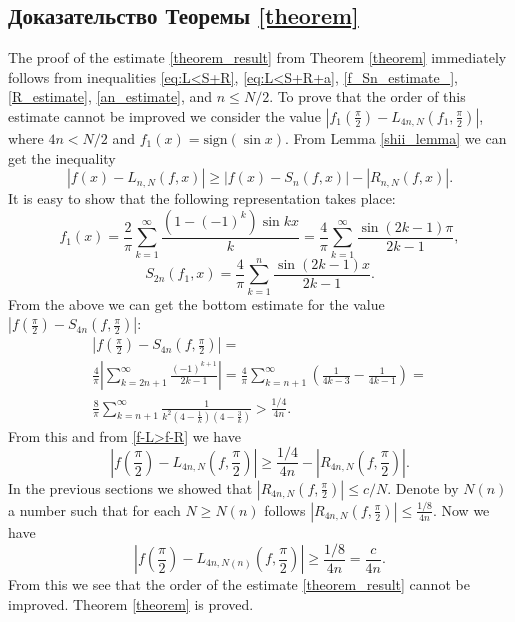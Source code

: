 \subsection{Доказательство Теоремы \ref{theorem}}
The proof of the estimate \eqref{theorem_result} from Theorem \ref{theorem} immediately follows from inequalities \eqref{eq:L<S+R}, \eqref{eq:L<S+R+a}, \eqref{f_Sn_estimate_}, \eqref{R_estimate}, \eqref{an_estimate},
and $n \leq N/2$.
To prove that the order of this estimate cannot be improved we consider the value $\left|f_1(\frac{\pi}{2}) - L_{4n,N}(f_1,\frac{\pi}{2})\right|$, where $4n < N/2$ and $f_1(x) = \mbox{sign} (\sin x)$.
From Lemma \ref{shii_lemma} we can get the inequality
\begin{equation*}
\left|f(x) - L_{n,N}(f,x)\right| \geq \left|f(x) - S_n(f,x)\right| -  \left|R_{n,N}(f,x)\right|.
\end{equation*}
It is easy to show that the following representation takes place:
\begin{equation} \label{f-L>f-R}
f_1(x) = \frac{2}{\pi} \sum_{k=1}^{\infty} \frac{(1-(-1)^k) \sin kx}{k} = \frac{4}{\pi} \sum_{k=1}^{\infty} \frac{\sin (2k-1)\pi}{2k-1},
\end{equation}
\begin{equation*}
S_{2n}(f_1,x) = \frac{4}{\pi} \sum_{k=1}^{n} \frac{\sin(2k-1)x}{2k-1}.
\end{equation*}
From the above we can get the bottom estimate for the value $\left|f\left(\frac{\pi}{2}\right) - S_{4n}\left(f,\frac{\pi}{2}\right)\right|$: 
\begin{multline*}
\left|f\left(\frac{\pi}{2}\right) - S_{4n}\left(f,\frac{\pi}{2}\right)\right| = \\
\frac{4}{\pi} \left|\sum_{k=2n+1}^{\infty} \frac{(-1)^{k+1}}{2k-1}\right| = 
\frac{4}{\pi} \sum_{k=n+1}^{\infty} \left(\frac{1}{4k-3} - \frac{1}{4k-1}\right)= \\
\frac{8}{\pi} \sum_{k=n+1}^{\infty} \frac{1}{k^2 \left(4-\frac{1}{k}\right) \left(4- \frac{3}{k}\right)} > \frac{1/4}{4n}.
\end{multline*}
From this and from \eqref{f-L>f-R} we have
\begin{equation*}
\left|f\left(\frac{\pi}{2}\right) - L_{4n,N}\left(f,\frac{\pi}{2}\right)\right| \geq \frac{1/4}{4n} - \left|R_{4n,N}\left(f,\frac{\pi}{2}\right)\right|.
\end{equation*}
In the previous sections we showed that $\left|R_{4n,N}\left(f,\frac{\pi}{2}\right)\right| \leq c/N $.
Denote by $N(n)$ a number such that for each $N \geq N(n)$ follows $\left|R_{4n,N}\left(f,\frac{\pi}{2}\right)\right| \leq \frac{1/8}{4n}$. Now we have
\begin{equation*}
\left|f\left(\frac{\pi}{2}\right) - L_{4n,N(n)}\left(f,\frac{\pi}{2}\right)\right| \geq \frac{1/8}{4n} = \frac{c}{4n}.
\end{equation*}
From this we see that the order of the estimate \eqref{theorem_result} cannot be improved. Theorem \ref{theorem} is proved.
